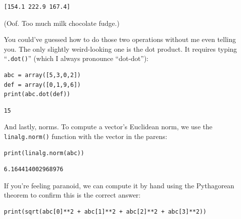 \begin{Verbatim}[fontsize=\small,samepage=true,frame=leftline,framesep=5mm,framerule=1mm]
[154.1 222.9 167.4]
\end{Verbatim}

(Oof. Too much milk chocolate fudge.)

\smallskip


You could've guessed how to do those two operations without me even telling
you. The only slightly weird-looking one is the dot product. It requires typing
``\texttt{.dot()}'' (which I always pronounce ``dot-dot''):

\begin{Verbatim}[fontsize=\small,samepage=true,frame=single,framesep=3mm]
abc = array([5,3,0,2])
def = array([0,1,9,6])
print(abc.dot(def))

\end{Verbatim}
\vspace{-.2in}

\begin{Verbatim}[fontsize=\small,samepage=true,frame=leftline,framesep=5mm,framerule=1mm]
15
\end{Verbatim}

\pagebreak
{}

And lastly, norms. To compute a vector's Euclidean norm, we use the
\texttt{linalg.norm()} function with the vector in the parens:

\label{pythonNorm}

\begin{Verbatim}[fontsize=\small,samepage=true,frame=single,framesep=3mm]
print(linalg.norm(abc))
\end{Verbatim}
\vspace{-.2in}

\begin{Verbatim}[fontsize=\small,samepage=true,frame=leftline,framesep=5mm,framerule=1mm]
6.164414002968976
\end{Verbatim}

If you're feeling paranoid, we can compute it by hand using the Pythagorean
theorem to confirm this is the correct answer:

\begin{Verbatim}[fontsize=\small,samepage=true,frame=single,framesep=3mm]
print(sqrt(abc[0]**2 + abc[1]**2 + abc[2]**2 + abc[3]**2))
\end{Verbatim}
\vspace{-.2in}

